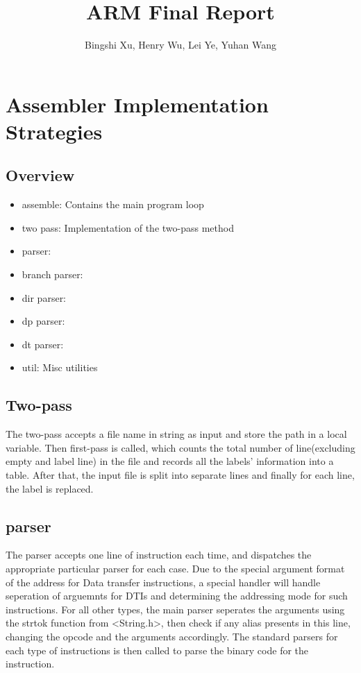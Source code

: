 \documentclass[11pt]{article}
\begin{document}
\title{ARM Final Report}
\author{Bingshi Xu, Henry Wu, Lei Ye, Yuhan Wang}

\maketitle

\section{Assembler Implementation Strategies}

\subsection{Overview}
\begin{itemize}
    \item assemble: Contains the main program loop
    \item two pass: Implementation of the two-pass method
    \item parser: 
    \item branch parser: 
    \item dir parser: 
    \item dp parser:
    \item dt parser:
    \item util: Misc utilities
\end{itemize}

\subsection{Two-pass}
The two-pass accepts a file name in string as input and store the path in a local variable. 
Then first-pass is called, which counts the total number of line(excluding empty and label line) 
in the file and records all the labels' information into a table. After that, the input file is split
into separate lines and finally for each line, the label is replaced.

\subsection{parser}
The parser accepts one line of instruction each time, and dispatches the appropriate particular parser for each case.
Due to the special argument format of the address for Data transfer instructions, a special handler will handle seperation of arguemnts for DTIs and determining the 
addressing mode for such instructions. For all other types, the main parser seperates the arguments using the strtok function from <String.h>, then check if any alias presents in 
this line, changing the opcode and the arguments accordingly. The standard parsers for each type of instructions is then called to parse the binary code for the instruction.
\end{document}
